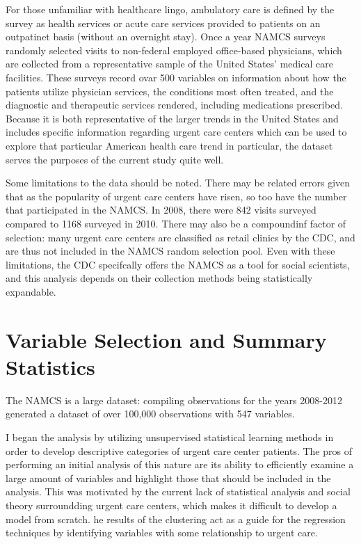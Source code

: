 \documentclass[12pt,twoside]{reedthesis}
\begin{document}
  For those unfamiliar with healthcare lingo, ambulatory care is defined
  by the survey as health services or acute care services provided to
  patients on an outpatinet basis (without an overnight stay). Once a year
  NAMCS surveys randomly selected visits to non-federal employed
  office-based physicians, which are collected from a representative
  sample of the United States' medical care facilities. These surveys
  record ovar 500 variables on information about how the patients utilize
  physician services, the conditions most often treated, and the
  diagnostic and therapeutic services rendered, including medications
  prescribed. Because it is both representative of the larger trends in
  the United States and includes specific information regarding urgent
  care centers which can be used to explore that particular American
  health care trend in particular, the dataset serves the purposes of the
  current study quite well.
  
  Some limitations to the data should be noted. There may be related
  errors given that as the popularity of urgent care centers have risen,
  so too have the number that participated in the NAMCS. In 2008, there
  were 842 visits surveyed compared to 1168 surveyed in 2010. There may
  also be a compoundinf factor of selection: many urgent care centers are
  classified as retail clinics by the CDC, and are thus not included in
  the NAMCS random selection pool. Even with these limitations, the CDC
  specifcally offers the NAMCS as a tool for social scientists, and this
  analysis depends on their collection methods being statistically
  expandable.
  
  \section{Variable Selection and Summary
  Statistics}\label{variable-selection-and-summary-statistics}
  
  The NAMCS is a large dataset: compiling observations for the years
  2008-2012 generated a dataset of over 100,000 observations with 547
  variables.
  
  I began the analysis by utilizing unsupervised statistical learning
  methods in order to develop descriptive categories of urgent care center
  patients. The pros of performing an initial analysis of this nature are
  its ability to efficiently examine a large amount of variables and
  highlight those that should be included in the analysis. This was
  motivated by the current lack of statistical analysis and social theory
  surroundding urgent care centers, which makes it difficult to develop a
  model from scratch. he results of the clustering act as a guide for the
  regression techniques by identifying variables with some relationship to
  urgent care.
  
\end{document}
